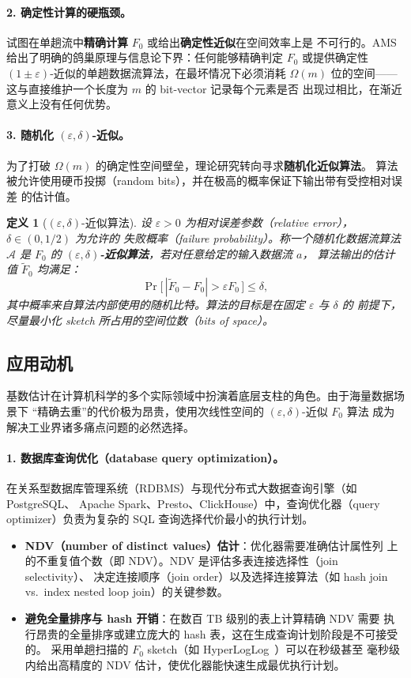 \documentclass[UTF8, 11pt, a4paper, linestretch=1.15]{ctexart}
\theoremstyle{zhstyle}
\newtheorem{definition}{定义}
\newcommand{\eps}{\varepsilon}
\newcommand{\Fzero}{F_0}
\begin{document}
	\paragraph{2. 确定性计算的硬瓶颈。}
	试图在单趟流中\textbf{精确计算} $\Fzero$ 或给出\textbf{确定性近似}在空间效率上是
	不可行的。AMS~\cite{AMS99} 给出了明确的鸽巢原理与信息论下界：任何能够精确判定
	$\Fzero$ 或提供确定性 $(1 \pm \eps)$-近似的单趟数据流算法，在最坏情况下必须消耗
	$\Omega(m)$ 位的空间——这与直接维护一个长度为 $m$ 的 bit-vector 记录每个元素是否
	出现过相比，在渐近意义上没有任何优势。
	
	\paragraph{3. 随机化 $(\eps, \delta)$-近似。}
	为了打破 $\Omega(m)$ 的确定性空间壁垒，理论研究转向寻求\textbf{随机化近似算法}。
	算法被允许使用硬币投掷（random bits），并在极高的概率保证下输出带有受控相对误差
	的估计值。
	
	\begin{definition}[$(\eps, \delta)$-近似算法]
		设 $\eps > 0$ 为相对误差参数（relative error），$\delta \in (0, 1/2)$ 为允许的
		失败概率（failure probability）。称一个随机化数据流算法 $\mathcal{A}$ 是
		$\Fzero$ 的 \textbf{$(\eps, \delta)$-近似算法}，若对任意给定的输入数据流 $a$，
		算法输出的估计值 $\tilde{F}_0$ 均满足：
		\[
		\Pr\big[\,|\tilde{F}_0 - \Fzero| > \eps \Fzero\,\big] \leq \delta,
		\]
		其中概率来自算法内部使用的随机比特。算法的目标是在固定 $\eps$ 与 $\delta$ 的
		前提下，尽量最小化 sketch 所占用的空间位数（bits of space）。
	\end{definition}
	
	\subsection{应用动机}
	
	基数估计在计算机科学的多个实际领域中扮演着底层支柱的角色。由于海量数据场景下
	“精确去重”的代价极为昂贵，使用次线性空间的 $(\eps, \delta)$-近似 $\Fzero$ 算法
	成为解决工业界诸多痛点问题的必然选择。
	
	\paragraph{1. 数据库查询优化（database query optimization）。}
	在关系型数据库管理系统（RDBMS）与现代分布式大数据查询引擎（如 PostgreSQL、
	Apache Spark、Presto、ClickHouse）中，查询优化器（query optimizer）负责为复杂的
	SQL 查询选择代价最小的执行计划。
	\begin{itemize}
		\item \textbf{NDV（number of distinct values）估计}：优化器需要准确估计属性列
		上的不重复值个数（即 NDV）。NDV 是评估多表连接选择性（join selectivity）、
		决定连接顺序（join order）以及选择连接算法（如 hash join vs.\ index nested
		loop join）的关键参数。
		\item \textbf{避免全量排序与 hash 开销}：在数百 TB 级别的表上计算精确 NDV 需要
		执行昂贵的全量排序或建立庞大的 hash 表，这在生成查询计划阶段是不可接受的。
		采用单趟扫描的 $\Fzero$ sketch（如 HyperLogLog~\cite{HLL07}）可以在秒级甚至
		毫秒级内给出高精度的 NDV 估计，使优化器能快速生成最优执行计划。
	\end{itemize}
	
\end{document}
